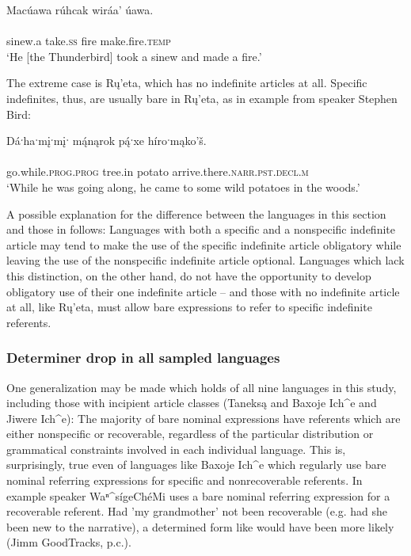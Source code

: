 \documentclass[output=paper]{LSP/langsci}
\begin{document}
\ea\label{eagledrop}
Macúawa rúhcak wiráa’ úawa.\rmfnm\\
\gll	{} 	 		\\
	sinew.a 		take.\textsc{ss} 	fire 			make.fire.\textsc{temp}\\
\glt	`He [the Thunderbird] took a sinew and made a fire.'
\z

The extreme case is Rų’eta, which has no indefinite articles at all. Specific indefinites, thus, are usually bare in Rų’eta, as in example  from speaker Stephen Bird:

\ea\label{birddrop}
Dáˑhaˑmįˑmįˑ m\'{ą}nąrok p\'{ą}ˑxe híroˑmąko’š.\rmfnm\\
\gll	{}				\\
	go.while.\textsc{prog.prog} 	tree.in 			potato 		arrive.there.\textsc{narr.pst.decl.m}\\
\glt	`While he was going along, he came to some wild potatoes in the woods.'
\z

A possible explanation for the difference between the languages in this section and those in  follows: Languages with both a specific and a nonspecific indefinite article may tend to make the use of the specific indefinite article obligatory while leaving the use of the nonspecific indefinite article optional. Languages which lack this distinction, on the other hand, do not have the opportunity to develop obligatory use of their one indefinite article -- and those with no indefinite article at all, like Rų’eta, must allow bare expressions to refer to specific indefinite referents.

\subsubsection{Determiner drop in all sampled languages}\label{dropsummary}

One generalization may be made which holds of all nine languages in this study, including those with incipient article classes (Taneksą and Baxoje Ich\^{}e and Jiwere Ich\^{}e): The majority of bare nominal expressions have referents which are either nonspecific or recoverable, regardless of the particular distribution or grammatical constraints involved in each individual language. This is, surprisingly, true even of languages like Baxoje Ich\^{}e which regularly use bare nominal referring expressions for specific and nonrecoverable referents. In example  speaker Waⁿ\^{}sígeChéMi uses a bare nominal referring expression for a recoverable referent. Had 'my grandmother' not been recoverable (e.g. had she been new to the narrative), a determined form like  would have been more likely (Jimm GoodTracks, p.c.).
\end{document}
